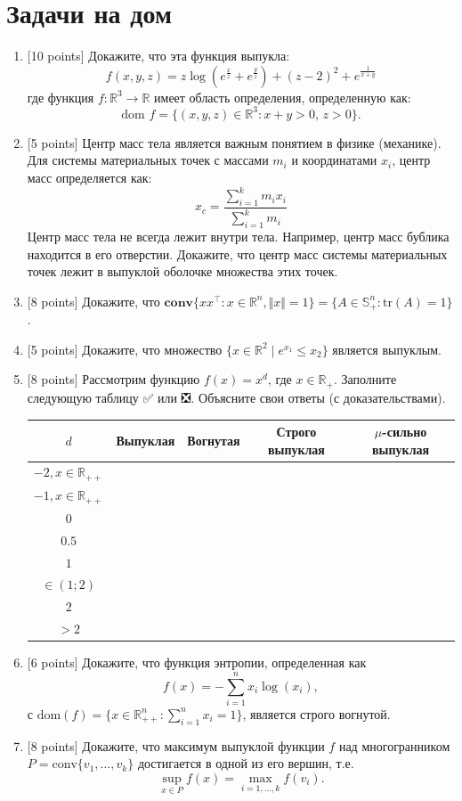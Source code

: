 \documentclass[
  russian,
  letterpaper,
  DIV=11,
  numbers=noendperiod]{scrartcl}
\newcommand{\R}{\mathbb{R}}
\begin{document}
\section{Задачи на
дом}\label{ux437ux430ux434ux430ux447ux438-ux43dux430-ux434ux43eux43c}

\begin{enumerate}
\def\labelenumi{\arabic{enumi}.}
\item
  {[}10 points{]} Докажите, что эта функция выпукла: \[
   f(x, y, z) = z \log \left(e^{\frac{x}{z}} + e^{\frac{y}{z}}\right) + (z - 2)^2 + e^{\frac{1}{x + y}}
   \] где функция \(f : \mathbb{R}^3 \to \mathbb{R}\) имеет область
  определения, определенную как: \[
   \text{dom } f = \{ (x, y, z) \in \mathbb{R}^3 : x + y > 0, \, z > 0 \}.
   \]
\item
  {[}5 points{]} Центр масс тела является важным понятием в физике
  (механике). Для системы материальных точек с массами \(m_i\) и
  координатами \(x_i\), центр масс определяется как: \[
   x_c = \frac{\sum_{i=1}^k m_i x_i}{\sum_{i=1}^k m_i}
   \] Центр масс тела не всегда лежит внутри тела. Например, центр масс
  бублика находится в его отверстии. Докажите, что центр масс системы
  материальных точек лежит в выпуклой оболочке множества этих точек.
\item
  {[}8 points{]} Докажите, что
  \(\mathbf{conv}\{xx^\top: x \in \mathbb{R}^n, \Vert x\Vert  = 1\} = \{A \in \mathbb{S}^n_+: \text{tr}(A) = 1\}\).
\item
  {[}5 points{]} Докажите, что множество
  \(\{x \in \mathbb{R}^2 \mid e^{x_1}\le x_2\}\) является выпуклым.
\item
  {[}8 points{]} Рассмотрим функцию \(f(x) = x^d\), где
  \(x \in \mathbb{R}_{+}\). Заполните следующую таблицу ✅ или ❎.
  Объясните свои ответы (с доказательствами).

  \begin{longtable}[]{@{}ccccc@{}}
  \toprule\noalign{}
  \(d\) & Выпуклая & Вогнутая & Строго выпуклая & \(\mu\)-сильно
  выпуклая \\
  \midrule\noalign{}
  \endhead
  \bottomrule\noalign{}
  \endlastfoot
  \(-2, x \in \mathbb{R}_{++}\) & & & & \\
  \(-1, x \in \mathbb{R}_{++}\) & & & & \\
  \(0\) & & & & \\
  \(0.5\) & & & & \\
  \(1\) & & & & \\
  \(\in (1; 2)\) & & & & \\
  \(2\) & & & & \\
  \(> 2\) & & & & \\
  \end{longtable}
\item
  {[}6 points{]} Докажите, что функция энтропии, определенная как \[
   f(x) = -\sum_{i=1}^n x_i \log(x_i),
   \] с \(\text{dom}(f) = \{x \in \R^n_{++} : \sum_{i=1}^n x_i = 1\}\),
  является строго вогнутой.
\item
  {[}8 points{]} Докажите, что максимум выпуклой функции \(f\) над
  многогранником\(P = \text{conv}\{v_1, \ldots, v_k\}\) достигается в
  одной из его вершин, т.е. \[
   \sup_{x \in P} f(x) = \max_{i=1, \ldots, k} f(v_i).
   \]


\end{enumerate}
\end{document}
